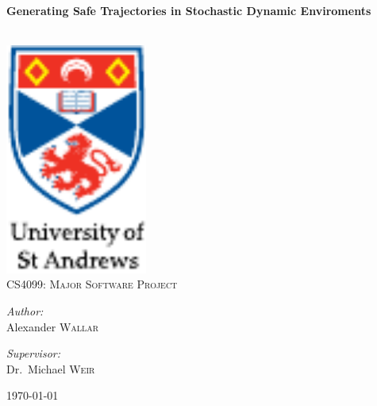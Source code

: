 
\begin{titlepage}

\begin{center}

\HRule \\[0.4cm]
{\huge \bfseries Generating Safe Trajectories in Stochastic Dynamic Enviroments
\\[0.4cm] }

\HRule \\[3cm]


\includegraphics[width=0.35\textwidth]{figs/st-andrews-logo}~\\[1cm]

\textsc{\Large CS4099: Major Software Project}\\[1cm]

\noindent

\begin{minipage}{0.3\textwidth}

\begin{center} \large

\emph{Author:}\\

Alexander \textsc{Wallar}

\end{center}

\end{minipage}%
\begin{minipage}{0.3\textwidth}

\begin{center} \large

\emph{Supervisor:} \\

Dr.~Michael \textsc{Weir}

\end{center}

\end{minipage}%

\vfill

{\large \today}

\end{center}

\end{titlepage}
